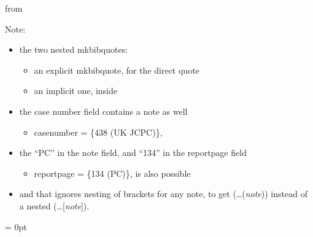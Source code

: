 \bigskip
from

{}

\bigskip
Note:
\begin{itemize}
\item the two nested mkbibquotes:
\begin{itemize}
\item an explicit mkbibquote, for the direct quote
\item an implicit one, inside 
\end{itemize}
\item the case number field contains a note as well 
\begin{itemize}
\item {\ttfamily casenumber = \{438 (UK JCPC)\},}
\end{itemize}
\item the ``PC'' in the note field, and ``134'' in the reportpage field
\begin{itemize}
\item {\ttfamily reportpage = \{134 (PC)\},} is also possible
\end{itemize}
\item and that  ignores nesting of brackets for any note, to get (\ldots (\textit{note})) instead of a nested (\ldots [\textit{note}]).
\end{itemize}


\newpage

\bigskip
{}



\bigskip
{}





\parindent = 0pt

